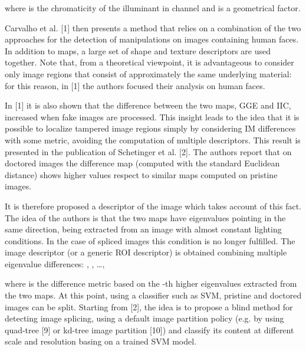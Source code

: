 where  is the chromaticity of the illuminant in channel  and  is a geometrical factor.

Carvalho et al. [1] then presents a method that relies on a combination of the two approaches for the detection of manipulations on images containing human faces. In addition to maps, a large set of shape and texture descriptors are used together. Note that, from a theoretical viewpoint, it is advantageous to consider only image regions that consist of approximately the same underlying material: for this reason, in [1] the authors focused their analysis on human faces.

In [1] it is also shown that the difference between the two maps, GGE and IIC, increased when fake images are processed. This insight leads to the idea that it is possible to localize tampered image regions simply by considering IM differences with some metric, avoiding the computation of multiple descriptors.
This result is presented in the publication of Schetinger et al. [2]. The authors report that on doctored images the difference map (computed with the standard Euclidean distance) shows higher values respect to similar maps computed on pristine images.

It is therefore proposed a descriptor of the image which takes account of this fact. The idea of the authors is that the two maps have eigenvalues pointing in the same direction, being extracted from an image with almost constant lighting conditions. In the case of spliced images this condition is no longer fulfilled. The image descriptor (or a generic ROI descriptor) is obtained combining multiple eigenvalue differences:
, , …,

where  is the difference metric based on the -th higher eigenvalues extracted from the two maps. At this point, using a classifier such as SVM, pristine and doctored images can be split. 
Starting from [2], the idea is to propose a blind method for detecting image splicing, using a default image partition policy (e.g. by using quad-tree [9] or kd-tree image partition [10]) and classify its content at different scale and resolution basing on a trained SVM model.
